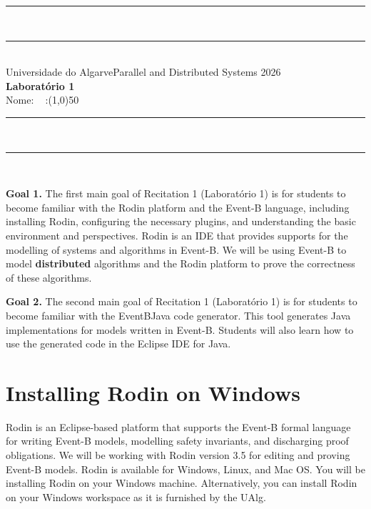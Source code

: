 \documentclass{article} %
\newcommand{\eb}{\textsf{Event-B}\xspace}
\newcommand{\ebtj}{\textsf{Event\-B\-2\-Java}\xspace}
\begin{document}
\begin{center}
\rule{\textwidth}{.0075in} \\
\rule[3mm]{\textwidth}{.0075in}\\

Universidade do Algarve\hfill Parallel and Distributed Systems \hfill 2026\\[3ex]

{\Large\bf Laboratório 1} \\[3ex]

\vspace*{0.30cm} Nome: 
   \ %
  \textnumero:\line(1,0){50}

\rule{\textwidth}{.0075in} \\
\rule[3mm]{\textwidth}{.0075in} \\
\end{center}

\bigskip

\noindent
\textbf{Goal 1.} The first main goal of Recitation 1 (Laboratório 1) is for students to become familiar with the Rodin platform and the \eb language, including installing Rodin, configuring the necessary plugins, and understanding the basic environment and perspectives. Rodin is an IDE that provides supports for the modelling of systems and algorithms in \eb. We will be using \eb to model \textbf{distributed} algorithms and the Rodin platform to prove the correctness of these algorithms. 

\bigskip

\noindent
\textbf{Goal 2.} The second main goal of Recitation 1 (Laboratório 1) is for students to become familiar with the \ebtj code generator. This tool generates Java implementations for models written in \eb. Students will also learn how to use the generated code in the Eclipse IDE for Java.

\section{Installing Rodin on Windows}
\label{sec_rodin_windows}
%
Rodin is an Eclipse-based platform that supports the \eb formal language for writing \eb models, modelling safety invariants, and discharging proof obligations. We will be working with Rodin version 3.5 for editing and proving \eb models. Rodin is available for Windows, Linux, and Mac OS. You will be installing Rodin on your Windows machine. Alternatively, you can install Rodin on your Windows workspace as it is furnished by the UAlg. 
\end{document}
